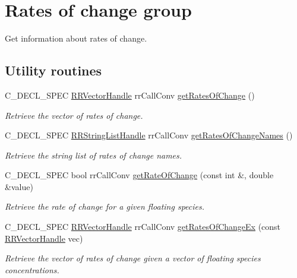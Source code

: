 \hypertarget{group__rate_of_change}{
\section{\-Rates of change group}
\label{group__rate_of_change}
}


\-Get information about rates of change.  


\subsection*{\-Utility routines}
\begin{DoxyCompactItemize}
\item 
\-C\-\_\-\-D\-E\-C\-L\-\_\-\-S\-P\-E\-C \hyperlink{rr__c__types_8h_aea46a16752b0ae2cd95c009030ee630e}{\-R\-R\-Vector\-Handle} \*
rr\-Call\-Conv \hyperlink{group__utility_gabbe129bee63761f7b0f98f060b86067b}{get\-Rates\-Of\-Change} ()
\begin{DoxyCompactList}\small\item\em \-Retrieve the vector of rates of change. \end{DoxyCompactList}\item 
\-C\-\_\-\-D\-E\-C\-L\-\_\-\-S\-P\-E\-C \hyperlink{rr__c__types_8h_abf561b014879247b7b92ee99c205de21}{\-R\-R\-String\-List\-Handle} \*
rr\-Call\-Conv \hyperlink{group__utility_gaf9d5b185617519ceff1a018d9009c0fd}{get\-Rates\-Of\-Change\-Names} ()
\begin{DoxyCompactList}\small\item\em \-Retrieve the string list of rates of change names. \end{DoxyCompactList}\item 
\-C\-\_\-\-D\-E\-C\-L\-\_\-\-S\-P\-E\-C bool rr\-Call\-Conv \hyperlink{group__utility_gaad38321993112e230f7fccd96345de6c}{get\-Rate\-Of\-Change} (const int \&, double \&value)
\begin{DoxyCompactList}\small\item\em \-Retrieve the rate of change for a given floating species. \end{DoxyCompactList}\item 
\-C\-\_\-\-D\-E\-C\-L\-\_\-\-S\-P\-E\-C \hyperlink{rr__c__types_8h_aea46a16752b0ae2cd95c009030ee630e}{\-R\-R\-Vector\-Handle} \*
rr\-Call\-Conv \hyperlink{group__utility_gacfae48e32754e7678b8bb003df93ef53}{get\-Rates\-Of\-Change\-Ex} (const \hyperlink{rr__c__types_8h_aea46a16752b0ae2cd95c009030ee630e}{\-R\-R\-Vector\-Handle} vec)
\begin{DoxyCompactList}\small\item\em \-Retrieve the vector of rates of change given a vector of floating species concentrations. \end{DoxyCompactList}\end{DoxyCompactItemize}


